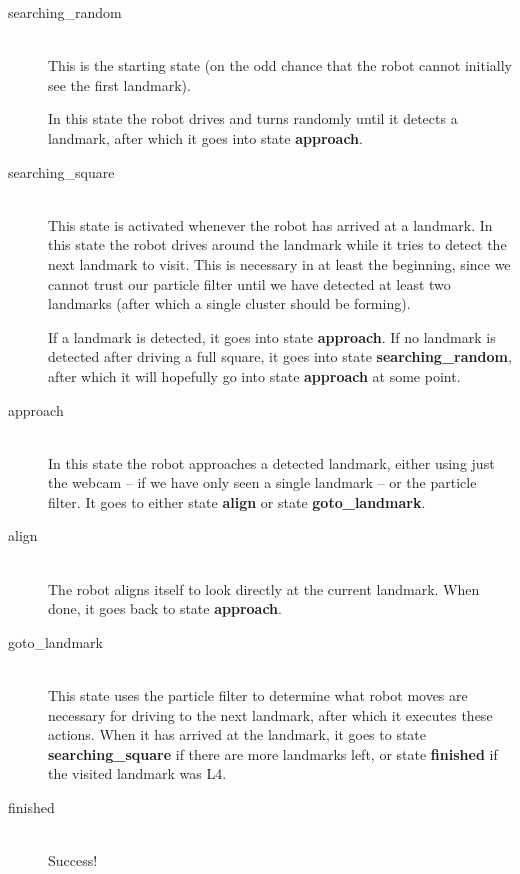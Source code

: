 \documentclass[a4paper,12pt]{article}
\begin{document}
\begin{description}
\item[searching_random]\hfill\\
This is the starting state (on the odd chance that the robot cannot initially
see the first landmark).

In this state the robot drives and turns randomly until it detects a landmark,
after which it goes into state \textbf{approach}.


\item[searching_square]\hfill\\
This state is activated whenever the robot has arrived at a landmark.  In this
state the robot drives around the landmark while it tries to detect the next
landmark to visit.  This is necessary in at least the beginning, since we cannot
trust our particle filter until we have detected at least two landmarks (after
which a single cluster should be forming).

If a landmark is detected, it goes into state \textbf{approach}.  If no landmark
is detected after driving a full square, it goes into state
\textbf{searching_random}, after which it will hopefully go into state
\textbf{approach} at some point.


\item[approach]\hfill\\
In this state the robot approaches a detected landmark, either using just the
webcam -- if we have only seen a single landmark -- or the particle filter.  It
goes to either state \textbf{align} or state \textbf{goto_landmark}.


\item[align]\hfill\\
The robot aligns itself to look directly at the current landmark.  When done, it
goes back to state \textbf{approach}.


\item[goto_landmark]\hfill\\
This state uses the particle filter to determine what robot moves are necessary
for driving to the next landmark, after which it executes these actions.  When
it has arrived at the landmark, it goes to state \textbf{searching_square} if
there are more landmarks left, or state \textbf{finished} if the visited
landmark was L4.


\item[finished]\hfill\\
Success!

\end{description}
\end{document}
